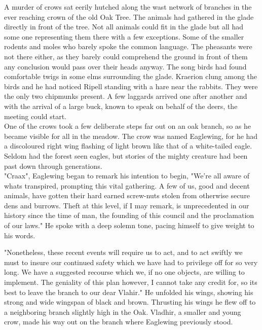 \documentclass[smalldemyvopaper,11pt,twoside,onecolumn,openright,extrafontsizes]{memoir}
\begin{document}
A murder of crows sat eerily hutched along the wast network of branches in the ever reaching crown of the old Oak Tree. The animals had gathered in the glade directly in front of the tree. Not all animals could fit in the glade but all had some one representing them there with a few exceptions. Some of the smaller rodents and moles who barely spoke the common language. The pheasants were not there either, as they barely could comprehend the ground in front of them any conclusion would pass over their heads anyway. The song birds had found comfortable twigs in some elms surrounding the glade. Kraerion clung among the birds and he had noticed Ripell standing with a hare near the rabbits. They were the only two chipmunks present. A few laggards arrived one after another and with the arrival of a large buck, known to speak on behalf of the deers, the meeting could start. \\

One of the crows took a few deliberate steps far out on an oak branch, so as he became visible for all in the meadow. The crow was named Eaglewing, for he had a discoloured right wing flashing of light brown like that of a white-tailed eagle. Seldom had the forest seen eagles, but stories of the mighty creature had been past down through generations.\\

"Craax", Eaglewing began to remark his intention to begin, "We're all aware of whats transpired, prompting this vital gathering. A few of us, good and decent animals, have gotten their hard earned screw-nuts stolen from otherwise secure dens and burrows. Theft at this level, if I may remark, is unprecedented in our history since the time of man, the founding of this council and the proclamation of our laws." He spoke with a deep solemn tone, pacing himself to give weight to his words.

"Nonetheless, these recent events will require us to act, and to act swiftly we must to insure our continued safety which we have had to privilege off for so very long. We have a suggested recourse which we, if no one objects, are willing to implement. The geniality of this plan however, I cannot take any credit for, so its best to leave the branch to our dear Vlahir." He unfolded his wings, showing his strong and wide wingspan of black and brown. Thrusting his wings he flew off to a neighboring branch slightly high in the Oak. Vladhir, a smaller and young crow, made his way out on the branch where Eaglewing previously stood.\\
\end{document}
